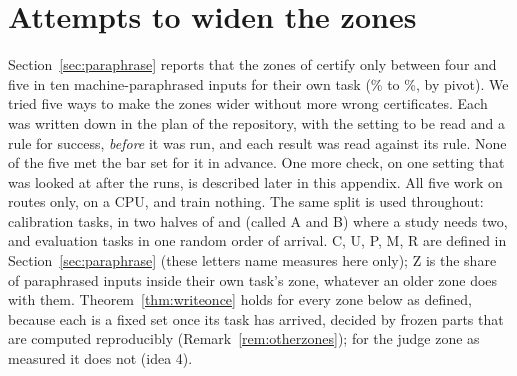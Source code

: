 \clearpage
\section{Attempts to widen the zones}
\label{app:widen}

Section~\ref{sec:paraphrase} reports that the zones of \cert{} certify only between four and five in ten
machine-paraphrased inputs for their own task (\WidenRefTfivePLow{}\% to \WidenRefTfivePHigh{}\%, by pivot). We tried five ways to make the zones wider without
more wrong certificates. Each was written down in the plan of the repository, with the setting to be
read and a rule for success, \emph{before} it was run, and each result was read against its rule.
None of the five met the bar set for it in advance. One more check, on one setting that was looked at after the runs, is described later in this appendix. All five work on routes only, on a CPU, and train nothing. The same split is used throughout:
\WidenTasksCal{} calibration tasks, in two halves of \WidenHalfA{} and \WidenHalfB{} (called A and B)
where a study needs two, and \WidenTasksEval{} evaluation tasks in one random order of arrival. \textsf{C}, \textsf{U}, \textsf{P}, \textsf{M}, \textsf{R} are defined
in Section~\ref{sec:paraphrase} (these letters name measures here only); \textsf{Z} is the share of paraphrased inputs inside their own task's zone,
whatever an older zone does with them. Theorem~\ref{thm:writeonce} holds for every zone below as defined, because
each is a fixed set once its task has arrived, decided by frozen parts that are computed reproducibly (Remark~\ref{rem:otherzones}); for the judge zone as
measured it does not (idea 4).

